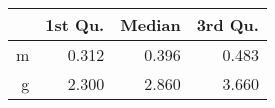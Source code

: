 \begin{table}[ht]
\centering
\begin{tabular}{rrrr}
  \hline
 & 1st Qu. & Median & 3rd Qu. \\ 
  \hline
m & 0.312 & 0.396 & 0.483 \\ 
  g & 2.300 & 2.860 & 3.660 \\ 
   \hline
\end{tabular}
\end{table}
